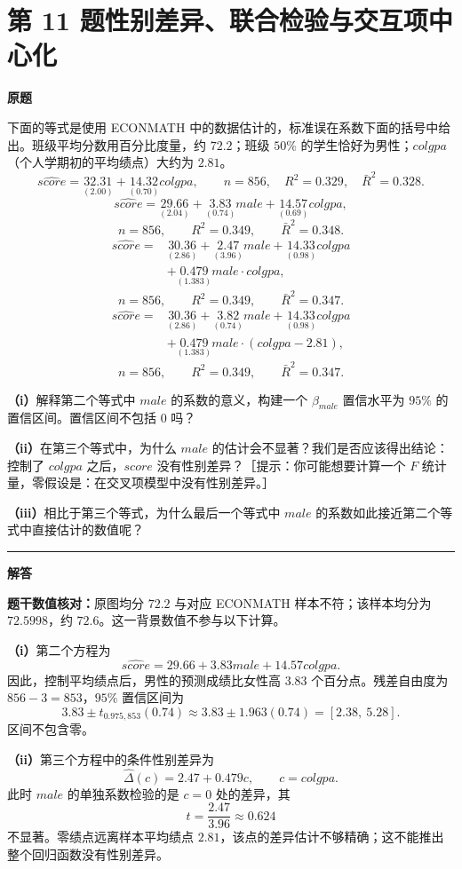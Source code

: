 \documentclass[UTF8,a4paper,11pt,fontset=fandol]{ctexart}
\newcommand{\vr}[1]{\mathit{#1}}
\newcommand{\subq}[1]{\par\medskip\noindent\textbf{（#1）}\enspace}
\newcommand{\question}[2]{\def\currentquestiontitle{第 #1 题\quad #2}}
\newcommand{\coef}[2]{\underset{\scriptstyle(#2)}{#1}}
\newenvironment{originalquestion}{%
  \par\medskip\noindent\begin{minipage}{\linewidth}
  \section*{\currentquestiontitle}
  \par\smallskip\noindent\textbf{原题}\par\smallskip
  \begingroup\small\setlength{\parskip}{2.5pt}%
}{%
  \par\endgroup\end{minipage}\par\medskip\Needspace{6\baselineskip}
  \noindent\rule{\linewidth}{0.35pt}\par\smallskip
  \noindent\textbf{解答}\par
}
\begin{document}
\question{11}{性别差异、联合检验与交互项中心化}
\begin{originalquestion}
下面的等式是使用 ECONMATH 中的数据估计的，标准误在系数下面的括号中给出。班级平均分数用百分比度量，约 $72.2$；班级 $50\%$ 的学生恰好为男性；$\vr{colgpa}$（个人学期初的平均绩点）大约为 $2.81$。
\[
\widehat{\vr{score}}=\coef{32.31}{2.00}+\coef{14.32}{0.70}\vr{colgpa},
\qquad n=856,\quad R^2=0.329,\quad\bar R^2=0.328.
\]
\[
\widehat{\vr{score}}=\coef{29.66}{2.04}+\coef{3.83}{0.74}\vr{male}
+\coef{14.57}{0.69}\vr{colgpa},
\]
\[
n=856,\qquad R^2=0.349,\qquad\bar R^2=0.348.
\]
\[
\begin{aligned}
\widehat{\vr{score}}={}&\coef{30.36}{2.86}+\coef{2.47}{3.96}\vr{male}
+\coef{14.33}{0.98}\vr{colgpa}\\
&+\coef{0.479}{1.383}\vr{male}\cdot\vr{colgpa},
\end{aligned}
\]
\[
n=856,\qquad R^2=0.349,\qquad\bar R^2=0.347.
\]
\[
\begin{aligned}
\widehat{\vr{score}}={}&\coef{30.36}{2.86}+\coef{3.82}{0.74}\vr{male}
+\coef{14.33}{0.98}\vr{colgpa}\\
&+\coef{0.479}{1.383}\vr{male}\cdot(\vr{colgpa}-2.81),
\end{aligned}
\]
\[
n=856,\qquad R^2=0.349,\qquad\bar R^2=0.347.
\]

\subq{i}解释第二个等式中 $\vr{male}$ 的系数的意义，构建一个 $\beta_{\vr{male}}$ 置信水平为 $95\%$ 的置信区间。置信区间不包括 $0$ 吗？

\subq{ii}在第三个等式中，为什么 $\vr{male}$ 的估计会不显著？我们是否应该得出结论：控制了 $\vr{colgpa}$ 之后，$\vr{score}$ 没有性别差异？［提示：你可能想要计算一个 $F$ 统计量，零假设是：在交叉项模型中没有性别差异。］

\subq{iii}相比于第三个等式，为什么最后一个等式中 $\vr{male}$ 的系数如此接近第二个等式中直接估计的数值呢？
\end{originalquestion}

\noindent\textbf{题干数值核对：}原图均分 $72.2$ 与对应 ECONMATH 样本不符；该样本均分为 $72.5998$，约 $72.6$。这一背景数值不参与以下计算。

\subq{i}第二个方程为
\[
\widehat{\vr{score}}=29.66+3.83\vr{male}+14.57\vr{colgpa}.
\]
因此，控制平均绩点后，男性的预测成绩比女性高 $3.83$ 个百分点。残差自由度为 $856-3=853$，$95\%$ 置信区间为
\[
3.83\pm t_{0.975,853}(0.74)
\approx 3.83\pm1.963(0.74)
=\boxed{[2.38,\ 5.28]}.
\]
区间不包含零。

\subq{ii}第三个方程中的条件性别差异为
\[
\widehat\Delta(c)=2.47+0.479c,\qquad c=\vr{colgpa}.
\]
此时 $\vr{male}$ 的单独系数检验的是 $c=0$ 处的差异，其
\[
t=\frac{2.47}{3.96}\approx0.624
\]
不显著。零绩点远离样本平均绩点 $2.81$，该点的差异估计不够精确；这不能推出整个回归函数没有性别差异。
\end{document}
